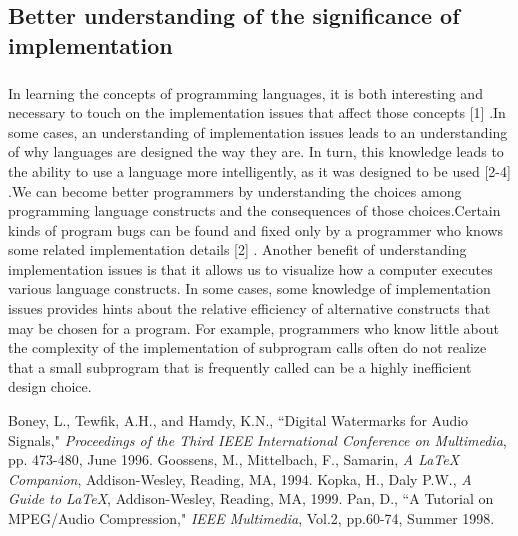 \documentclass[12pt]{article}
\begin{document}
\subsection{Better understanding of the significance of implementation}
\subparagraph{}In learning the concepts of programming languages, it is both interesting and necessary to touch on the implementation issues that affect those concepts [1] .In some cases, an understanding of implementation issues leads to an understanding of why languages are designed the way they are. In turn, this knowledge leads to the ability to use a language more intelligently, as it was designed to be used [2-4] .We can become better programmers by understanding the choices among programming language constructs and the consequences of those choices.Certain kinds of program bugs can be found and fixed only by a programmer who knows some related implementation details [2] . Another benefit of understanding implementation issues is that it allows us to visualize how a computer executes various language constructs. In some cases, some knowledge of implementation issues provides hints about the relative efficiency of alternative constructs that may be chosen for a program. For example, programmers who know little about the complexity of the implementation of subprogram calls often do not realize that a small subprogram that is frequently called can be a highly inefficient design choice.


\begin{thebibliography} {}

 Boney, L., Tewfik, A.H., and Hamdy, K.N., ``Digital
Watermarks for Audio Signals," \emph{Proceedings of the Third IEEE
International Conference on Multimedia}, pp. 473-480, June 1996.
 Goossens, M., Mittelbach, F., Samarin, \emph{A LaTeX
Companion}, Addison-Wesley, Reading, MA, 1994.
 Kopka, H., Daly P.W., \emph{A Guide to LaTeX},
Addison-Wesley, Reading, MA, 1999.
 Pan, D., ``A Tutorial on MPEG/Audio Compression," \emph{IEEE
Multimedia}, Vol.2, pp.60-74, Summer 1998.
\end{thebibliography}
\end{document}
